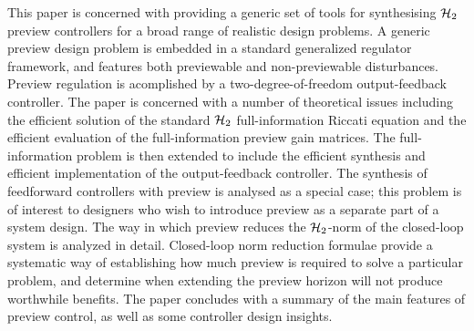 \label{sec:Abstract}
This paper is concerned with  providing a generic set of tools for synthesising $\mathcal H_2$ preview controllers for a broad range of realistic design problems. A generic preview design problem is 
embedded in a standard generalized regulator framework, and features both previewable and non-previewable disturbances. Preview regulation is acomplished by a two-degree-of-freedom output-feedback controller. The paper is concerned with a number of theoretical issues including the efficient solution of the standard $\mathcal H_2$ full-information Riccati equation and the efficient evaluation of the full-information preview gain matrices. The full-information problem is then extended to include the efficient synthesis and efficient implementation of the output-feedback controller.
 The synthesis of feedforward controllers with preview is analysed as a special case; this problem is of interest to designers who wish to introduce preview as a separate part of a system design. The way in which preview reduces the $\mathcal H_2$-norm of the closed-loop system is analyzed in detail.
Closed-loop norm reduction formulae provide a systematic way of establishing how much preview is required to solve a particular problem, and determine when extending the preview horizon will not produce worthwhile benefits. The paper concludes with a summary of the main features of preview control, as well as some controller design insights. 